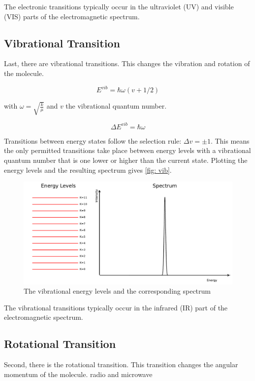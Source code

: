 \documentclass[twoside, single, authoryear, semicolon]{lion-msc}
\newcommand{\4}{$_4$}
\newcommand{\3}{$_3$}
\newcommand{\2}{$_2$}
\begin{document}
The electronic transitions typically occur in the ultraviolet (UV) and visible (VIS) parts of the electromagnetic spectrum.
\subsection{Vibrational Transition}
Last, there are vibrational transitions. This changes the vibration and rotation of the molecule.

\begin{equation}
    E^{vib}=\hbar\omega(v+1/2)
\end{equation}

with $\omega=\sqrt{\frac{k}{\mu}}$ and $v$ the vibrational quantum number. 

\begin{equation}
    \Delta E^{vib}=\hbar\omega
\end{equation}

Transitions between energy states follow the selection rule: $\Delta v=\pm 1$. This means the only permitted transitions take place between energy levels with a vibrational quantum number that is one lower or higher than the current state. Plotting the energy levels and the resulting spectrum gives \autoref{fig: vib}.

\begin{figure}[!ht]
    \centering
    \includegraphics[width=\linewidth]{Figures/VibSpectrum.pdf}
    \caption{The vibrational energy levels and the corresponding spectrum}
    \label{fig: vib}
\end{figure}

The vibrational transitions typically occur in the infrared (IR) part of the electromagnetic spectrum.
\subsection{Rotational Transition}
Second, there is the rotational transition. This transition changes the angular momentum of the molecule. radio and microwave
\end{document}
